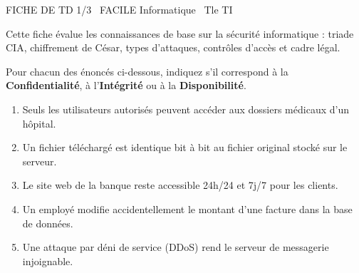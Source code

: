 \documentclass[11pt]{article}
\begin{document}
\begin{tcolorbox}[enhanced,colback=popink,colframe=popink,arc=10pt,boxrule=0pt,left=12pt,right=12pt,top=9pt,bottom=9pt]
{\color{white}\popxbold\small FICHE DE TD 1/3 \textbullet\ FACILE \hfill Informatique \textbullet\ Tle TI\par}
\end{tcolorbox}
\vspace{4pt}
Cette fiche évalue les connaissances de base sur la sécurité informatique : triade CIA, chiffrement de César, types d'attaques, contrôles d'accès et cadre légal.

\makeatletter
{}
\makeatother
\begin{exercice}
Pour chacun des énoncés ci-dessous, indiquez s'il correspond à la \textbf{Confidentialité}, à l'\textbf{Intégrité} ou à la \textbf{Disponibilité}.
\begin{enumerate}
    \item Seuls les utilisateurs autorisés peuvent accéder aux dossiers médicaux d'un hôpital.
    \item Un fichier téléchargé est identique bit à bit au fichier original stocké sur le serveur.
    \item Le site web de la banque reste accessible 24h/24 et 7j/7 pour les clients.
    \item Un employé modifie accidentellement le montant d'une facture dans la base de données.
    \item Une attaque par déni de service (DDoS) rend le serveur de messagerie injoignable.
\end{enumerate}
\end{exercice}
\end{document}
